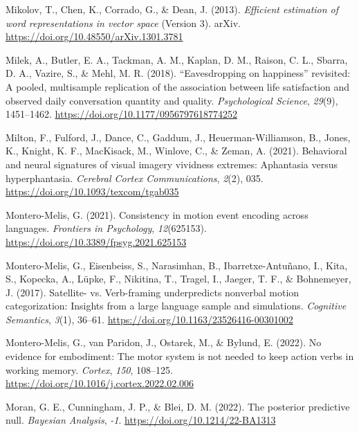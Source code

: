 \documentclass[
  12pt,
  man,floatsintext]{apa7}
\newlength{\cslhangindent}
\newlength{\cslentryspacingunit} %
\newenvironment{CSLReferences}[2] %
 {%
  \setlength{\parindent}{0pt}
  \ifodd #1
  \let\oldpar\par
  \def\par{\hangindent=\cslhangindent\oldpar}
  \fi
  \setlength{\parskip}{#2\cslentryspacingunit}
 }%
 {}
\begin{document}
\begin{CSLReferences}{1}{0}
\leavevmode{}%
Mikolov, T., Chen, K., Corrado, G., \& Dean, J. (2013). \emph{Efficient estimation of word representations in vector space} (Version 3). {arXiv}. \url{https://doi.org/10.48550/arXiv.1301.3781}

\leavevmode{}%
Milek, A., Butler, E. A., Tackman, A. M., Kaplan, D. M., Raison, C. L., Sbarra, D. A., Vazire, S., \& Mehl, M. R. (2018). {``{Eavesdropping} on happiness''} revisited: {A} pooled, multisample replication of the association between life satisfaction and observed daily conversation quantity and quality. \emph{Psychological Science}, \emph{29}(9), 1451--1462. \url{https://doi.org/10.1177/0956797618774252}

\leavevmode{}%
Milton, F., Fulford, J., Dance, C., Gaddum, J., Heuerman-Williamson, B., Jones, K., Knight, K. F., MacKisack, M., Winlove, C., \& Zeman, A. (2021). Behavioral and neural signatures of visual imagery vividness extremes: Aphantasia versus hyperphantasia. \emph{Cerebral Cortex Communications}, \emph{2}(2), 035. \url{https://doi.org/10.1093/texcom/tgab035}

\leavevmode{}%
Montero-Melis, G. (2021). Consistency in motion event encoding across languages. \emph{Frontiers in Psychology}, \emph{12}(625153). \url{https://doi.org/10.3389/fpsyg.2021.625153}

\leavevmode{}%
Montero-Melis, G., Eisenbeiss, S., Narasimhan, B., Ibarretxe-Antuñano, I., Kita, S., Kopecka, A., Lüpke, F., Nikitina, T., Tragel, I., Jaeger, T. F., \& Bohnemeyer, J. (2017). Satellite- vs. Verb-framing underpredicts nonverbal motion categorization: Insights from a large language sample and simulations. \emph{Cognitive Semantics}, \emph{3}(1), 36--61. \url{https://doi.org/10.1163/23526416-00301002}

\leavevmode{}%
Montero-Melis, G., van Paridon, J., Ostarek, M., \& Bylund, E. (2022). No evidence for embodiment: {The} motor system is not needed to keep action verbs in working memory. \emph{Cortex}, \emph{150}, 108--125. \url{https://doi.org/10.1016/j.cortex.2022.02.006}

\leavevmode{}%
Moran, G. E., Cunningham, J. P., \& Blei, D. M. (2022). The posterior predictive null. \emph{Bayesian Analysis}, \emph{-1}. \url{https://doi.org/10.1214/22-BA1313}


\end{CSLReferences}
\end{document}
